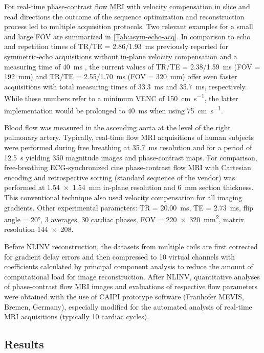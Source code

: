 For real-time phase-contrast flow MRI with velocity compensation in slice and read directions the outcome of the sequence optimization and reconstruction process led to multiple acquisition protocols. Two relevant examples for a small and large FOV are summarized in \cref{Tab:asym-echo-acq}. In comparison to echo and repetition times of TR/TE = \num{2.86}/\SI{1.93}{\ms} previously reported for symmetric-echo acquisitions without in-plane velocity compensation and a measuring time of \SI{40}{\ms} \cite{2014_PC_Joseph}, the current values of TR/TE = \num{2.38}/\SI{1.59}{\ms} (FOV = \SI{192}{\mm}) and TR/TE = \num{2.55}/\SI{1.70}{\ms} (FOV = \SI{320}{\mm}) offer even faster acquisitions with total measuring times of \SI{33.3}{\ms} and \SI{35.7}{\ms}, respectively. While these numbers refer to a minimum VENC of \SI{150}{\cm\per\second}, the latter implementation would be prolonged to \SI{40}{\ms} when using \SI{75}{\cm\per\second}.

Blood flow was measured in the ascending aorta at the level of the right pulmonary artery. Typically, real-time flow MRI acquisitions of human subjects were performed during free breathing at \SI{35.7}{\ms} resolution and for a period of \SI{12.5}{\second} yielding \num{350} magnitude images and phase-contrast maps. For comparison, free-breathing ECG-synchronized cine phase-contrast flow MRI with Cartesian encoding and retrospective sorting (standard sequence of the vendor) was performed at \SI{1.54 x 1.54}{\mm} in-plane resolution and \SI{6}{\mm} section thickness. This conventional technique also used velocity compensation for all imaging gradients. Other experimental parameters: TR = \SI{20.00}{\ms}, TE = \SI{2.73}{\ms}, flip angle = \ang{20}, \num{3} averages, \num{30} cardiac phases, FOV = \SI{220 x 320}{\square\mm}, matrix resolution \num{144x208}.

Before NLINV reconstruction, the datasets from multiple coils are first corrected for gradient delay errors \cite{2015_PC_Asym} and then compressed to \num{10} virtual channels with coefficients calculated by principal component analysis to reduce the amount of computational load for image reconstruction. After NLINV, quantitative analyses of phase-contrast flow MRI images and evaluations of respective flow parameters were obtained with the use of CAIPI prototype software (Franhofer MEVIS, Bremen, Germany), especially modified for the automated analysis of real-time MRI acquisitions (typically \num{10} cardiac cycles).


\subsection{Results}
